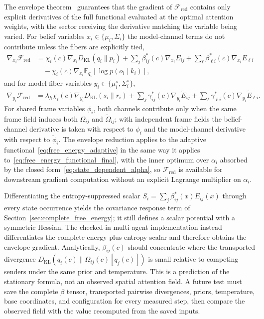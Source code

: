 \documentclass[11pt]{article}
\begin{document}
The envelope theorem~\cite{MilgromSegal2002} guarantees that the gradient of $\mathcal{F}_{\mathrm{red}}$ contains only explicit derivatives of the full functional evaluated at the optimal attention weights, with the sector receiving the derivative matching the variable being varied. For belief variables $x_i \in \{\mu_i,\Sigma_i\}$ the model-channel terms do not contribute unless the fibers are explicitly tied,
\begin{equation}
\begin{aligned}
\nabla_{x_i}\mathcal{F}_{\mathrm{red}}
&= \chi_i(c)\nabla_{x_i}D_{\mathrm{KL}}(q_i\|p_i)
+ \sum_j \beta^*_{ij}(c)\nabla_{x_i}E_{ij}
+ \sum_\ell \beta^*_{\ell i}(c)\nabla_{x_i}E_{\ell i} \\
&\quad - \chi_i(c)\nabla_{x_i}\mathbb{E}_{q_i}[\log p(o_i\mid k_i)],
\end{aligned}
\label{eq:envelope_gradient_belief}
\end{equation}
and for model-fiber variables $y_i \in \{\mu^s_i,\Sigma^s_i\}$,
\begin{equation}
\begin{aligned}
\nabla_{y_i}\mathcal{F}_{\mathrm{red}}
&= \lambda_h\chi_i(c)\nabla_{y_i}D_{\mathrm{KL}}(s_i\|r_i)
+ \sum_j \gamma^*_{ij}(c)\nabla_{y_i}\tilde E_{ij}
+ \sum_\ell \gamma^*_{\ell i}(c)\nabla_{y_i}\tilde E_{\ell i}.
\end{aligned}
\label{eq:envelope_gradient_model}
\end{equation}
For shared frame variables $\phi_i$, both channels contribute only when the same frame field induces both $\Omega_{ij}$ and $\tilde{\Omega}_{ij}$; with independent frame fields the belief-channel derivative is taken with respect to $\phi_i$ and the model-channel derivative with respect to $\tilde{\phi}_i$. The envelope reduction applies to the adaptive functional~\eqref{eq:free_energy_adaptive} in the same way it applies to~\eqref{eq:free_energy_functional_final}, with the inner optimum over $\alpha_i$ absorbed by the closed form~\eqref{eq:state_dependent_alpha}, so $\mathcal{F}_{\mathrm{red}}$ is available for downstream gradient computation without an explicit Lagrange multiplier on $\alpha_i$.

Differentiating the entropy-suppressed scalar $S_i=\sum_j \beta_{ij}^*(x)E_{ij}(x)$ through every state occurrence yields the covariance response term of Section~\ref{sec:complete_free_energy}; it still defines a scalar potential with a symmetric Hessian. The checked-in multi-agent implementation instead differentiates the complete energy-plus-entropy scalar and therefore obtains the envelope gradient. Analytically, $\beta_{ij}(c)$ should concentrate where the transported divergence $D_{\mathrm{KL}}(q_i(c)\|\Omega_{ij}(c)[q_j(c)])$ is small relative to competing senders under the same prior and temperature. This is a prediction of the stationary formula, not an observed spatial attention field. A future test must save the complete $\beta$ tensor, transported pairwise divergences, priors, temperature, base coordinates, and configuration for every measured step, then compare the observed field with the value recomputed from the saved inputs.
\end{document}
